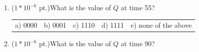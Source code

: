 \documentclass{article}
\begin{document}
\begin{enumerate}

\item {($1*10^{-6}$ pt.)}What is the value of $Q$ at time 55?

\begin{tabular}{p{0.6in} p{0.6in} p{0.6in} p{0.6in} l}
a) 0000 & b) 0001 & c) 1110 & d) 1111 & e) none of the above
\end{tabular}

\item {($1*10^{-6}$ pt.)}What is the value of $Q$ at time 90?


\end{enumerate}
\end{document}
